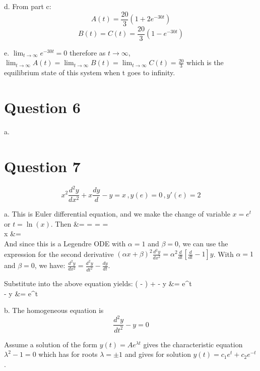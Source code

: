 \documentclass[12pt,twoside]{article}
\begin{document}
\item [d.]
From part c:
\[
	A(t) = \frac{20}{3} (1 + 2 e^{-30t})
\]
\[
	B(t) = C(t) =  \frac{20}{3} (1 - e^{-30t})
\]

\item [e.]
$\lim_{t \rightarrow \infty} e^{-30t} = 0$ therefore as $t \rightarrow \infty$, $\lim_{t \rightarrow \infty}  A(t) = \lim_{t \rightarrow \infty}  B(t)  = \lim_{t \rightarrow \infty}  C(t) = \frac{20}{3}$ which is the equilibrium state of this system
when t goes to infinity.

\ee

\section*{Question 6}
\be
\item [a.]

\ee

\section*{Question 7}
\[
	x^2 \frac{d^2 y}{dx^2} + x \frac{dy}{d} - y = x \, , y(e) = 0 \, , y'(e) = 2
\]

\be 
\item [a.]
This is Euler differential equation, and we make the change of variable $x=e^t$ or $t=\ln(x)$.
Then
\ba
	 &=   =   =    =     \\ 
	x   &=  \\
\ea
And since this is a Legendre ODE with $\alpha=1$ and $\beta=0$, we can use the expression for the second derivative 
$(\alpha x + \beta)^2 \frac{d^2y}{dx^2} = \alpha^2 \frac{d}{d t} [\frac{d}{dt} - 1] y$.
With $\alpha=1$ and $\beta=0$, we have: $ \frac{d^2y}{dx^2} =  \frac{d^2y}{dt^2} - \frac{dy}{dt}$. \\ \hfill \break

Substitute into the above equation yields:
\ba
	(  - ) +  - y &= e^t \\
	  - y &= e^t \\
\ea

\item [b.]
The homogeneous equation is
\[
	 \frac{d^2y}{dt^2} - y = 0
\]

Assume a solution of the form $y(t) = A e^{\lambda t}$ gives the characteristic equation $\lambda^2 - 1 = 0$ which has for roots $\lambda = \pm1$ and gives
for solution $y(t) = c_1 e^t + c_2 e^{-t}$.
\end{document}
